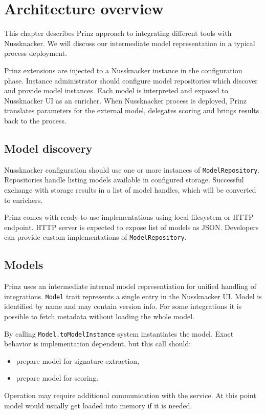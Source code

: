 \chapter{Architecture overview}
\label{chap:arch}

This chapter describes Prinz approach to integrating different tools with Nussknacker.
We will discuss our intermediate model representation in a typical process deployment.

Prinz extensions are injected to a Nussknacker instance in the configuration phase.
Instance administrator should configure model repositories which discover and provide model instances.
Each model is interpreted and exposed to Nussknacker UI as an enricher.
When Nussknacker process is deployed, Prinz translates parameters for the external model, delegates scoring and brings results back to the process.

\section{Model discovery}

Nussknacker configuration should use one or more instances of \texttt{ModelRepository}.
Repositories handle listing models available in configured storage.
Successful exchange with storage results in a list of model handles, which will be converted to enrichers.

Prinz comes with ready-to-use implementations using local filesystem or HTTP endpoint.
HTTP server is expected to expose list of models as JSON.
Developers can provide custom implementations of \texttt{ModelRepository}.

\section{Models}

Prinz uses an intermediate internal model representiation for unified handling of integrations.
\texttt{Model} trait represents a single entry in the Nussknacker UI.
Model is identified by name and may contain version info.
For some integrations it is possible to fetch metadata without loading the whole model.

By calling \texttt{Model.toModelInstance} system instantiates the model.
Exact behavior is implementation dependent, but this call should:
\begin{itemize}
	\item prepare model for signature extraction,
	\item prepare model for scoring.
\end{itemize}
Operation may require additional communication with the service.
At this point model would usually get loaded into memory if it is needed.

